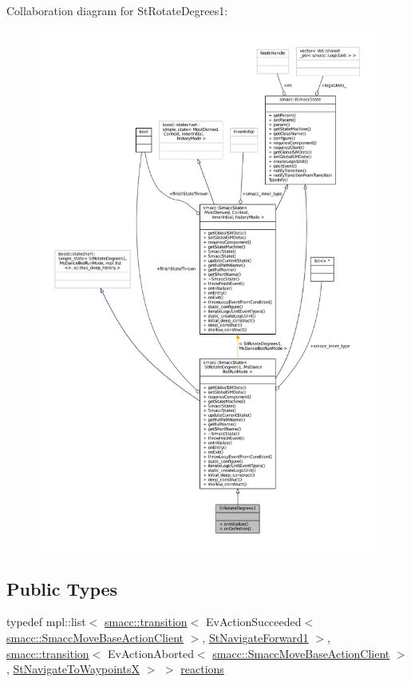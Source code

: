 Collaboration diagram for St\+Rotate\+Degrees1\+:
\nopagebreak
\begin{figure}[H]
\begin{center}
\leavevmode
\includegraphics[width=350pt]{structStRotateDegrees1__coll__graph}
\end{center}
\end{figure}
\subsection*{Public Types}
\begin{DoxyCompactItemize}
\item 
typedef mpl\+::list$<$ \hyperlink{classsmacc_1_1transition}{smacc\+::transition}$<$ Ev\+Action\+Succeeded$<$ \hyperlink{classsmacc_1_1SmaccMoveBaseActionClient}{smacc\+::\+Smacc\+Move\+Base\+Action\+Client} $>$, \hyperlink{structStNavigateForward1}{St\+Navigate\+Forward1} $>$, \hyperlink{classsmacc_1_1transition}{smacc\+::transition}$<$ Ev\+Action\+Aborted$<$ \hyperlink{classsmacc_1_1SmaccMoveBaseActionClient}{smacc\+::\+Smacc\+Move\+Base\+Action\+Client} $>$, \hyperlink{structStNavigateToWaypointsX}{St\+Navigate\+To\+WaypointsX} $>$ $>$ \hyperlink{structStRotateDegrees1_af5c4ed6af710a02fcc0b1a16252fce38}{reactions}
\end{DoxyCompactItemize}
